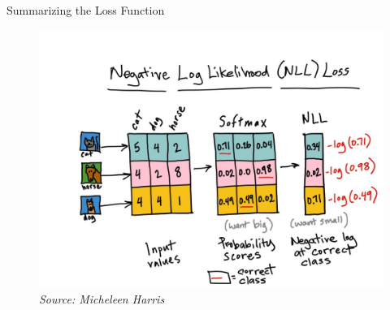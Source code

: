 \documentclass[xcolor=dvipsnames, fontsize=11pt, %
pagesize, %
parskip=half-, t]{beamer}
\begin{document}
 \begin{frame}{Summarizing the Loss Function}
 \begin{figure}[H] \center \includegraphics[scale=0.18]{fullpic.jpg}
 \caption{\textit{Source: Micheleen Harris}}
 \end{figure}
 \end{frame}
\end{document}
